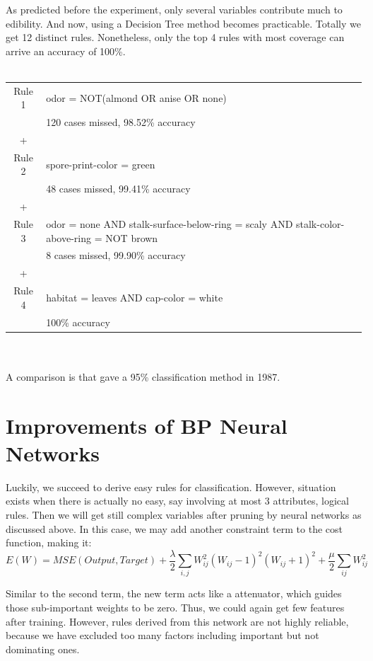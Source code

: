 \documentclass[runningheads]{llncs}
\newcommand*{\term}{\frac{\lambda}{2}\sum_{i, j}W_{ij}^2(W_{ij}-1)^2(W_{ij}+1)^2}
\begin{document}
As predicted before the experiment, only several variables contribute much to edibility. And now, using a Decision Tree method becomes practicable. Totally we get 12 distinct rules. Nonetheless, only the top 4 rules with most coverage can arrive an accuracy of 100\%.
\\\\
\begin{tabular}{c@{\qquad}l}
	Rule 1 & odor = NOT(almond OR anise OR none) \\
	& 120 cases missed, 98.52\% accuracy \\
	+ & \\
	Rule 2 & spore-print-color = green \\
	& 48 cases missed, 99.41\% accuracy \\
	+ & \\
	Rule 3 & odor = none AND stalk-surface-below-ring = scaly AND
	stalk-color-above-ring = NOT brown \\
	& 8 cases missed, 99.90\% accuracy \\
	+ & \\
	Rule 4 & habitat = leaves AND cap-color = white \\
	& 100\% accuracy \\
\end{tabular}
\\\\
A comparison is that \cite{schlimmer1987concept} gave a 95\% classification method in 1987.

\section{Improvements of BP Neural Networks}
Luckily, we succeed to derive easy rules for classification. However, situation exists when there is actually no easy, say involving at most 3 attributes, logical rules. Then we will get still complex variables after pruning by neural networks as discussed above. In this case, we may add another constraint term to the cost function, making it:
\begin{equation}
E(W) = MSE(Output, Target) + \term + \frac{\mu}{2}\sum_{ij}W_{ij}^2
\end{equation}

Similar to the second term, the new term acts like a attenuator, which guides those sub-important weights to be zero. Thus, we could again get few features after training. However, rules derived from this network are not highly reliable, because we have excluded too many factors including important but not dominating ones.
\end{document}
